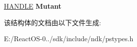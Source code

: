\begin{DoxyCompactItemize}
\begin{tabbing}
\end{tabbing}\item 
\mbox{\label{struct___i_n_i_t_i_a_l___p_e_b_aed4bfe5768fd6ca3e1acd2df52191a36}} 
\hyperlink{interfacevoid}{H\+A\+N\+D\+LE} {\bfseries Mutant}
\end{DoxyCompactItemize}


该结构体的文档由以下文件生成\+:\begin{DoxyCompactItemize}
\item 
E\+:/\+React\+O\+S-\/0../sdk/include/ndk/pstypes.\+h\end{DoxyCompactItemize}
